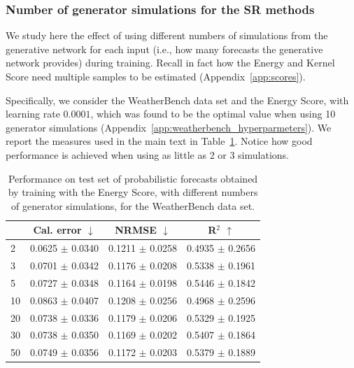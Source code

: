\documentclass[twoside,11pt]{article}
\begin{document}
	\subsubsection{Number of generator simulations for the SR methods}\label{app:n_outputs}
	
	We study here the effect of using different numbers of simulations from the generative network for each input (i.e., how many forecasts the generative network provides) during training. Recall in fact how the Energy and Kernel Score need multiple samples to be estimated (Appendix~\ref{app:scores}). 
	
	
	
	
	
	
	
	Specifically, we consider the WeatherBench data set and the Energy Score, with learning rate $ 0.0001 $, which was found to be the optimal value when using 10 generator simulations (Appendix~\ref{app:weatherbench_hyperparmeters}). We report the measures used in the main text in Table~\ref{tab:weatherbench_ens_n}. Notice how good performance is achieved when using as little as 2 or 3 simulations.
	
	\begin{table}[tb]
		\begin{center}
			\begin{tabular}{lccc}
				\toprule
				& Cal. error $ \downarrow $ & NRMSE $ \downarrow $ & R$ ^2 $ $ \uparrow $ \\
				\midrule
				2 & 	0.0625 $ \pm$ 0.0340 & 0.1211  $ \pm$ 0.0258 &  0.4935 $ \pm$ 0.2656  \\
				3 & 0.0701 $ \pm$ 0.0342 & 0.1176  $ \pm$ 0.0208 &  0.5338 $ \pm$ 0.1961 \\
				5 & 		 0.0727 $ \pm$ 0.0348 & 0.1164  $ \pm$ 0.0198 &  0.5446 $ \pm$ 0.1842 \\
				10 & 0.0863 $ \pm$ 0.0407 & 0.1208  $ \pm$ 0.0256 &  0.4968 $ \pm$ 0.2596 \\			
				20 &		 0.0738 $ \pm$ 0.0336 & 0.1179  $ \pm$ 0.0206 &  0.5329 $ \pm$ 0.1925  \\
				30 	&	 0.0738 $ \pm$ 0.0350 & 0.1169  $ \pm$ 0.0202 &  0.5407 $ \pm$ 0.1864 \\
				50 &  0.0749 $ \pm$ 0.0356 & 0.1172  $ \pm$ 0.0203 &  0.5379 $ \pm$ 0.1889  \\
				\bottomrule
			\end{tabular}
		\end{center}
		\caption{Performance on test set of probabilistic forecasts obtained by training with the Energy Score, with different numbers of generator simulations, for the WeatherBench data set.}	\label{tab:weatherbench_ens_n}
	\end{table}
	
\end{document}
